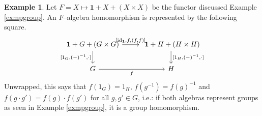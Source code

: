 \documentclass{article}
\theoremstyle{definition}
\newtheorem{exmp}[thm]{Example}
\theoremstyle{remark}
\newcommand{\id}{\text{id}}
\begin{document}
\begin{exmp}
	Let $F = X \mapsto \mathbf{1} + X + (X\times X)$ be the functor discussed Example \ref{exmpgroup}. An $F$--algebra homomorphism is represented by the following square.
	\begin{equation}\label{diag-homgroup}
		\centering
		\begin{tikzcd}
			\mathbf{1}+G+(G\times G) \arrow[d, "{[1_G,(-)^{-1},\cdot]}"'] \arrow[r, "{[\id_{\mathbf{1}},f,(f,f)]}"] & \ \mathbf{1}+H+(H\times H) \arrow[d, "{[1_H,(-)^{-1}, \cdot]}"] \\
			G \arrow[r, "f"']                           & H                       
		\end{tikzcd}
	\end{equation}
	Unwrapped, this says that $f(1_G) = 1_H$, $f(g^{-1}) = f(g)^{-1}$ and $f(g\cdot g') = f(g)\cdot f(g')$ for all $g,g' \in G$, i.e.: if both algebras represent groups as seen in Example \ref{exmpgroup}, it is a group homomorphism.
\end{exmp}
\end{document}
